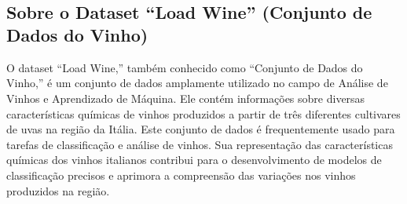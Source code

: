 \documentclass[11pt]{article}
\begin{document}
    \begin{center}
    \end{center}
    { \hspace*{\fill} \\}
    
    \begin{center}
    \end{center}
    { \hspace*{\fill} \\}
    
    \hypertarget{sobre-o-dataset-load-wine-conjunto-de-dados-do-vinho}{%
\subsection{Sobre o Dataset ``Load Wine'' (Conjunto de Dados do
Vinho)}\label{sobre-o-dataset-load-wine-conjunto-de-dados-do-vinho}}

O dataset ``Load Wine,'' também conhecido como ``Conjunto de Dados do
Vinho,'' é um conjunto de dados amplamente utilizado no campo de Análise
de Vinhos e Aprendizado de Máquina. Ele contém informações sobre
diversas características químicas de vinhos produzidos a partir de três
diferentes cultivares de uvas na região da Itália. Este conjunto de
dados é frequentemente usado para tarefas de classificação e análise de
vinhos. Sua representação das características químicas dos vinhos
italianos contribui para o desenvolvimento de modelos de classificação
precisos e aprimora a compreensão das variações nos vinhos produzidos na
região.
\end{document}
